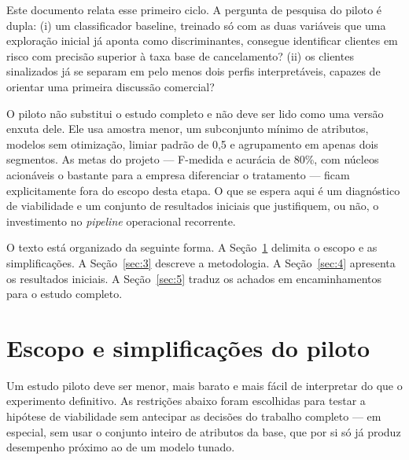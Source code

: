 \documentclass[12pt]{article}
\begin{document}
Este documento relata esse primeiro ciclo. A pergunta de pesquisa do piloto
é dupla: (i) um classificador baseline, treinado só com as duas variáveis
que uma exploração inicial já aponta como discriminantes, consegue
identificar clientes em risco com precisão superior à taxa base de
cancelamento? (ii) os clientes sinalizados já se separam em pelo menos dois
perfis interpretáveis, capazes de orientar uma primeira discussão comercial?

O piloto não substitui o estudo completo e não deve ser lido como uma versão
enxuta dele. Ele usa amostra menor, um subconjunto mínimo de atributos,
modelos sem otimização, limiar padrão de 0,5 e agrupamento em apenas dois
segmentos. As metas do projeto --- F-medida e acurácia de 80\%, com núcleos
acionáveis o bastante para a empresa diferenciar o tratamento --- ficam
explicitamente fora do escopo desta etapa. O
que se espera aqui é um diagnóstico de viabilidade e um conjunto de
resultados iniciais que justifiquem, ou não, o investimento no
\textit{pipeline} operacional recorrente.

O texto está organizado da seguinte forma. A Seção~\ref{sec:2} delimita o
escopo e as simplificações. A Seção~\ref{sec:3} descreve a metodologia. A
Seção~\ref{sec:4} apresenta os resultados iniciais. A Seção~\ref{sec:5}
traduz os achados em encaminhamentos para o estudo completo.

\section{Escopo e simplificações do piloto}
\label{sec:2}

Um estudo piloto deve ser menor, mais barato e mais fácil de interpretar do
que o experimento definitivo. As restrições abaixo foram escolhidas para
testar a hipótese de viabilidade sem antecipar as decisões do trabalho
completo --- em especial, sem usar o conjunto inteiro de atributos da base,
que por si só já produz desempenho próximo ao de um modelo tunado.
\end{document}
